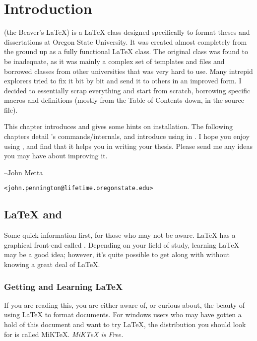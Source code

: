 
\chapter{Introduction}

\beavtex (the Beaver's \LaTeX{}) is a \LaTeX{} class designed specifically
to format theses and dissertations at Oregon State University. It
was created almost completely from the ground up as a fully functional
\LaTeX{} class. The original class was found to be inadequate, as
it was mainly a complex set of templates and files and borrowed classes
from other universities that was very hard to use. Many intrepid explorers
tried to fix it bit by bit and send it to others in an improved form.
I decided to essentially scrap everything and start from scratch,
borrowing specific macros and definitions (mostly from the Table of
Contents down, in the source file).

This chapter introduces \beavtex and gives some hints on installation.
The following chapters detail \beavtexnospace 's commands/internals,
and introduce using \beavtex in \LyX{}. I hope you enjoy using \beavtex,
and find that it helps you in writing your thesis. Please send me
any ideas you may have about improving it.

\bigskip{}
\noindent --John Metta

\noindent \texttt{<john.pennington@lifetime.oregonstate.edu>}


\section{\LaTeX{} and \LyX{}}

Some quick information first, for those who may not be aware. \LaTeX{}
has a graphical front-end called \LyX{}. Depending on your field of
study, learning \LaTeX{} may be a good idea; however, it's quite possible
to get along with \LyX{} without knowing a great deal of \LaTeX{}.


\subsection{Getting and Learning \LaTeX{}}

If you are reading this, you are either aware of, or curious about,
the beauty of using \LaTeX{} to format documents. For windows users
who may have gotten a hold of this document and want to try \LaTeX{},
the distribution you should look for is called MiK\TeX{}. \emph{MiK\TeX{}
is Free.}

